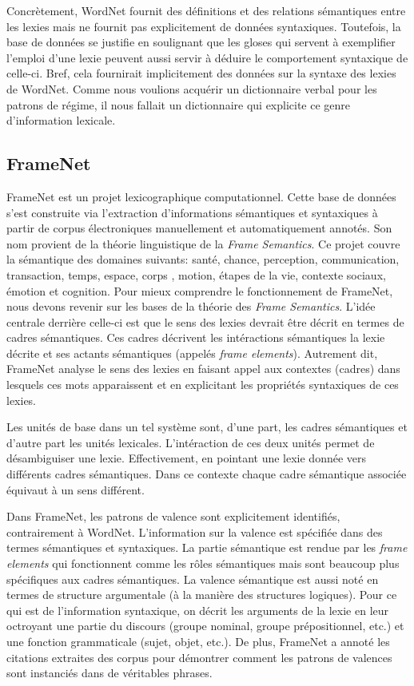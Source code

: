 Concrètement, WordNet fournit des définitions et des relations sémantiques entre les lexies mais ne fournit pas explicitement de données syntaxiques. Toutefois, la base de données se justifie en soulignant que les gloses qui servent à exemplifier l'emploi d'une lexie peuvent aussi servir à déduire le comportement syntaxique de celle-ci. Bref, cela fournirait implicitement des données sur la syntaxe des lexies de WordNet\cite{FellbaumLargescaleLexicographyDigital2014}. Comme nous voulions acquérir un dictionnaire verbal pour les patrons de régime, il nous fallait un dictionnaire qui explicite ce genre d'information lexicale.

\subsection{FrameNet}
FrameNet est un projet lexicographique computationnel. Cette base de données s'est construite via l'extraction d'informations sémantiques et syntaxiques à partir de  corpus électroniques manuellement et automatiquement annotés. Son nom provient de la théorie linguistique de la \emph{Frame Semantics}\citep{BakerBerkeleyFrameNetProject1998}. Ce projet couvre la sémantique des domaines suivants: santé, chance, perception, communication, transaction, temps, espace, corps , motion, étapes de la vie, contexte sociaux, émotion et cognition. Pour mieux comprendre le fonctionnement de FrameNet, nous devons revenir sur les bases de la théorie des \emph{Frame Semantics}. L'idée centrale derrière celle-ci est que le sens des lexies devrait être décrit en termes de cadres sémantiques. Ces cadres décrivent les intéractions sémantiques la lexie décrite et ses actants sémantiques (appelés \emph{frame elements}). Autrement dit, FrameNet analyse le sens des lexies en faisant appel aux contextes (cadres) dans lesquels ces mots apparaissent et en explicitant les propriétés syntaxiques de ces lexies. 

Les unités de base dans un tel système sont, d'une part, les cadres sémantiques et d'autre part les unités lexicales. L'intéraction de ces deux unités permet de désambiguiser une lexie. Effectivement, en pointant une lexie donnée vers différents cadres sémantiques. Dans ce contexte chaque cadre sémantique associée équivaut à un sens différent.

Dans FrameNet, les patrons de valence sont explicitement identifiés, contrairement à WordNet. L'information sur la valence est spécifiée dans des termes sémantiques et syntaxiques. La partie sémantique est rendue par les \emph{frame elements} qui fonctionnent comme les rôles sémantiques mais sont beaucoup plus spécifiques aux cadres sémantiques. La valence sémantique est aussi noté en termes de structure argumentale (à la manière des structures logiques). Pour ce qui est de l'information syntaxique, on décrit les arguments de la lexie en leur octroyant une partie du discours (groupe nominal, groupe prépositionnel, etc.) et une fonction grammaticale (sujet, objet, etc.). De plus, FrameNet a annoté les citations extraites des corpus pour démontrer comment les patrons de valences sont instanciés dans de véritables phrases. 

